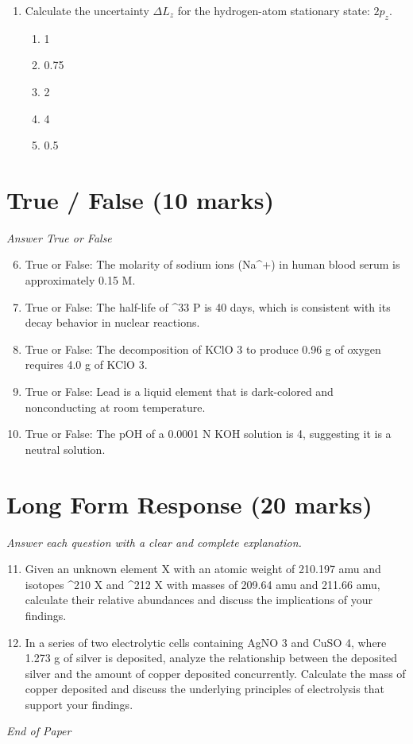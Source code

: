 \documentclass[12pt]{article}
\begin{document}
\begin{enumerate}[label=\arabic*.]
\begin{enumerate}[label=(\alph*)]
    \item CCl 2 F$_{2}$
    \item H$_{2}$O
    \item SF 6
\end{enumerate}
\item Calculate the uncertainty $\Delta L_z$ for the hydrogen-atom stationary state: $2 p_z$.
\begin{enumerate}[label=(\alph*)]
    \item 1
    \item 0.75
    \item 2
    \item 4
    \item 0.5
\end{enumerate}
\end{enumerate}

\section*{True / False (10 marks)}
\textit{Answer True or False}
\begin{enumerate}[label=\arabic*.]
\setcounter{enumi}{5}
\item True or False: The molarity of sodium ions (Na^+) in human blood serum is approximately 0.15 M.
\item True or False: The half-life of ^33 P is 40 days, which is consistent with its decay behavior in nuclear reactions.
\item True or False: The decomposition of KClO 3 to produce 0.96 g of oxygen requires 4.0 g of KClO 3.
\item True or False: Lead is a liquid element that is dark-colored and nonconducting at room temperature.
\item True or False: The pOH of a 0.0001 N KOH solution is 4, suggesting it is a neutral solution.
\end{enumerate}

\section*{Long Form Response (20 marks)}
\textit{Answer each question with a clear and complete explanation.}
\begin{enumerate}[label=\arabic*.]
\setcounter{enumi}{10}
\item Given an unknown element X with an atomic weight of 210.197 amu and isotopes ^210 X and ^212 X with masses of 209.64 amu and 211.66 amu, calculate their relative abundances and discuss the implications of your findings.
\item In a series of two electrolytic cells containing AgNO 3 and CuSO 4, where 1.273 g of silver is deposited, analyze the relationship between the deposited silver and the amount of copper deposited concurrently. Calculate the mass of copper deposited and discuss the underlying principles of electrolysis that support your findings.
\end{enumerate}

\vfill
\noindent\textit{End of Paper}
\end{document}
